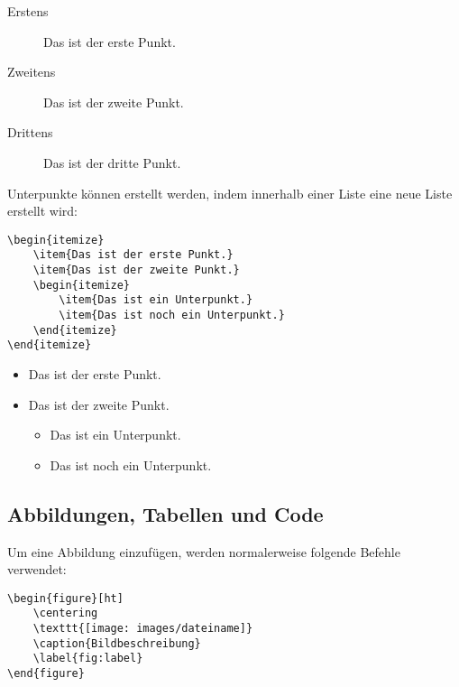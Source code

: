 \begin{description}
    \item[Erstens]{Das ist der erste Punkt.}
    \item[Zweitens]{Das ist der zweite Punkt.}
    \item[Drittens]{Das ist der dritte Punkt.}
\end{description}

\noindent Unterpunkte können erstellt werden, indem innerhalb einer Liste eine neue Liste erstellt wird:

\begin{verbatim}
\begin{itemize}
    \item{Das ist der erste Punkt.}
    \item{Das ist der zweite Punkt.}
    \begin{itemize}
        \item{Das ist ein Unterpunkt.}
        \item{Das ist noch ein Unterpunkt.}
    \end{itemize}
\end{itemize}
\end{verbatim}

\begin{itemize}
    \item{Das ist der erste Punkt.}
    \item{Das ist der zweite Punkt.}
    \begin{itemize}
        \item{Das ist ein Unterpunkt.}
        \item{Das ist noch ein Unterpunkt.}
    \end{itemize}
\end{itemize}

\subsection{Abbildungen, Tabellen und Code}


Um eine Abbildung einzufügen, werden normalerweise folgende Befehle verwendet:

\begin{verbatim}
\begin{figure}[ht]
    \centering
    \texttt{[image: images/dateiname]}
    \caption{Bildbeschreibung}
    \label{fig:label}
\end{figure}
\end{verbatim}

